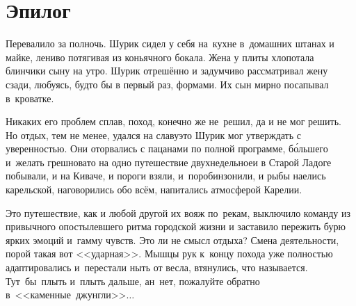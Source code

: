 
{
\cleardoublepage



\fancyhead[LE]{\fancyplain{}{}}
\fancyhead[RO]{\fancyplain{}{}}

\section*{Эпилог}


Перевалило за полночь. Шурик сидел у себя на~кухне в~домашних штанах и майке, лениво потягивая из коньячного бокала. Жена у плиты хлопотала блинчики сыну на утро. Шурик отрешённо и задумчиво рассматривал жену сзади, любуясь, будто бы в первый раз, формами. Их сын мирно посапывал в~кроватке. 

Никаких его проблем сплав, поход, конечно же не~решил, да и не мог решить. Но отдых, тем не менее, удался на славу\mdash это Шурик мог утверждать с уверенностью. Они оторвались с пацанами по полной программе, б\'{о}льшего и~желать грешновато на одно путешествие двухнедельное\mdash и в Старой Ладоге побывали, и на Киваче, и пороги взяли, и~поробинзонили, и рыбы наелись карельской, наговорились обо всём, напитались атмосферой Карелии.

Это путешествие, как и любой другой их вояж по~рекам, выключило команду из привычного опостылевшего ритма городской жизни и заставило пережить бурю ярких эмоций и~гамму чувств. Это ли не смысл отдыха? Смена деятельности, порой такая вот <<ударная>>. Мышцы рук к~концу похода уже полностью адаптировались и~перестали ныть от весла, втянулись, что называется. Тут~бы~плыть и~плыть дальше, ан~нет, пожалуйте обратно в~<<каменные~джунгли>>$\ldots$

}
